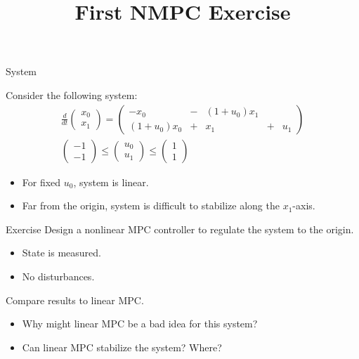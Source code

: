 \documentclass[xcolor=dvipsnames]{beamer}
\title{First NMPC Exercise}
\begin{document}
\frame{\titlepage}

\begin{frame}{System}
    
    Consider the following system:
    \begin{gather*}
        \frac{d}{dt} \begin{pmatrix} x_0 \\ x_1 \end{pmatrix} = \begin{pmatrix} -x_0 & - & (1 + u_0)x_1 & & \\ (1+u_0)x_0 & + & x_1 & + & u_1 \end{pmatrix} \\[1em]
        \begin{pmatrix} -1 \\ -1 \end{pmatrix} \le \begin{pmatrix} u_0 \\ u_1 \end{pmatrix} \le \begin{pmatrix} 1 \\ 1 \end{pmatrix}
    \end{gather*}
    
    \begin{itemize}
        \item For fixed $u_0$, system is linear.
        \item Far from the origin, system is difficult to stabilize along the $x_1$-axis.
    \end{itemize}
\end{frame}

\begin{frame}{Exercise}
    Design a nonlinear MPC controller to regulate the system to the origin.
    \begin{itemize}
        \item State is measured.
        \item No disturbances.
    \end{itemize}
    
    \medskip
    
    Compare results to linear MPC.
    \begin{itemize}
        \item Why might linear MPC be a bad idea for this system?
        \item Can linear MPC stabilize the system? Where?
    \end{itemize}
\end{frame}
\end{document}
